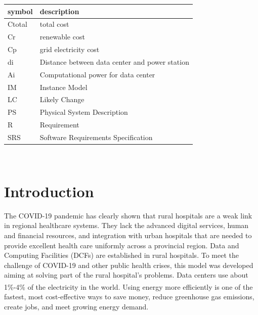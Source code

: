 \documentclass[12pt]{article}
\begin{document}
\renewcommand{\arraystretch}{1.2}
\begin{tabular}{l l} 
  \toprule		
  \textbf{symbol} & \textbf{description}\\
  \midrule 
  Ctotal & total cost\\
  Cr & renewable cost\\
  Cp & grid electricity cost\\
  di & Distance between data center and power station\\
  Ai & Computational power for data center\\
  IM & Instance Model\\
  LC & Likely Change\\
  PS & Physical System Description\\
  R & Requirement\\
  SRS & Software Requirements Specification\\

  \bottomrule
\end{tabular}\\



 



\newpage
\section{Introduction}

 The COVID-19 pandemic has clearly shown that rural hospitals are a weak link in regional healthcare systems. They lack the advanced digital services, human and financial resources, and integration with urban hospitals that are needed to provide excellent health care uniformly across a provincial region. Data and Computing Facilities (DCFs) are established in rural hospitals. To meet the challenge of COVID-19 and other public health crises, this model was developed aiming at solving part of the rural hospital's problems. Data centers use about 1\%-4\% of the electricity in the world\textsuperscript{\cite{rivier2013electricity}}. Using energy more efficiently is one of the fastest, most cost-effective ways to save money, reduce greenhouse gas emissions, create jobs, and meet growing energy demand.
\end{document}

